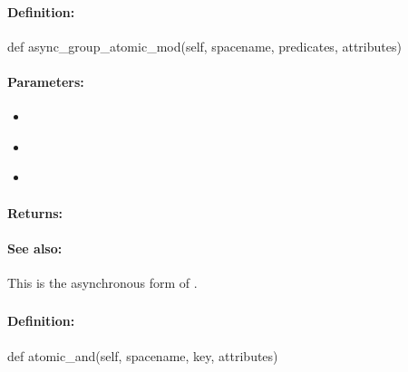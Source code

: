 \paragraph{Definition:}
\begin{pythoncode}
def async_group_atomic_mod(self, spacename, predicates, attributes)
\end{pythoncode}

\paragraph{Parameters:}
\begin{itemize}[noitemsep]
\item {}\\

\item {}\\

\item {}\\

\end{itemize}

\paragraph{Returns:}


\paragraph{See also:}  This is the asynchronous form of .

\pagebreak
\subsubsection{}
\label{api:python:atomic_and}


\paragraph{Definition:}
\begin{pythoncode}
def atomic_and(self, spacename, key, attributes)
\end{pythoncode}

